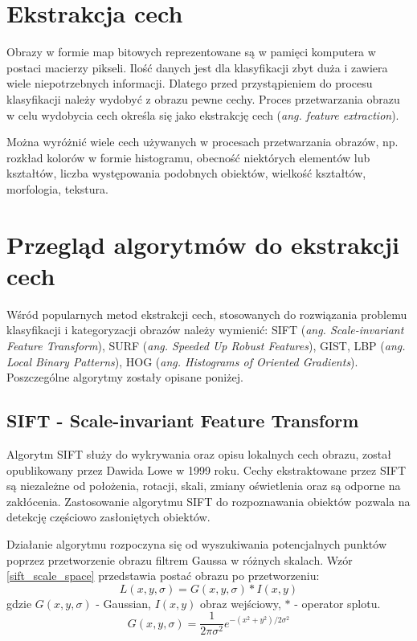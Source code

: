 \section{Ekstrakcja cech}

Obrazy w formie map bitowych reprezentowane są w pamięci komputera w postaci macierzy pikseli. Ilość danych jest dla klasyfikacji zbyt duża i zawiera wiele niepotrzebnych informacji. Dlatego przed przystąpieniem do procesu klasyfikacji należy wydobyć z obrazu pewne cechy. Proces przetwarzania obrazu w celu wydobycia cech określa się jako ekstrakcję cech (\emph{ang. feature extraction}).

Można wyróżnić wiele cech używanych w procesach przetwarzania obrazów, np. rozkład kolorów w formie histogramu, obecność niektórych elementów lub kształtów, liczba występowania podobnych obiektów, wielkość kształtów, morfologia, tekstura.

\section{Przegląd algorytmów do ekstrakcji cech}

Wśród popularnych metod ekstrakcji cech, stosowanych do rozwiązania problemu klasyfikacji i kategoryzacji obrazów należy wymienić: SIFT (\emph{ang. Scale-invariant Feature Transform})\cite{SIFT99}, SURF (\emph{ang. Speeded Up Robust Features}), GIST\cite{GIST09}, LBP (\emph{ang. Local Binary Patterns}), HOG (\emph{ang. Histograms of Oriented Gradients}). Poszczególne algorytmy zostały opisane poniżej.

\subsection{SIFT - Scale-invariant Feature Transform}

Algorytm SIFT służy do wykrywania oraz opisu lokalnych cech obrazu, został opublikowany przez Dawida Lowe w 1999 roku. Cechy ekstraktowane przez SIFT są niezależne od położenia, rotacji, skali, zmiany oświetlenia oraz są odporne na zakłócenia. Zastosowanie algorytmu SIFT do rozpoznawania obiektów pozwala na detekcję częściowo zasłoniętych obiektów.

Działanie algorytmu rozpoczyna się od wyszukiwania potencjalnych punktów poprzez przetworzenie obrazu filtrem Gaussa w różnych skalach. Wzór \ref{sift_scale_space} przedstawia postać obrazu po przetworzeniu:
\begin{equation} 
\label{sift_scale_space} 
L(x, y, \sigma) = G(x, y, \sigma) \ast I(x, y)
\end{equation} gdzie $G(x, y, \sigma)$ - Gaussian, $I(x, y)$ obraz wejściowy, $\ast$ - operator splotu.
\begin{equation} 
\label{sift_gaussian} 
G(x, y, \sigma) = \frac{1}{2\pi\sigma^2}e^{-(x^2+y^2)/2\sigma^2}
\end{equation} 

